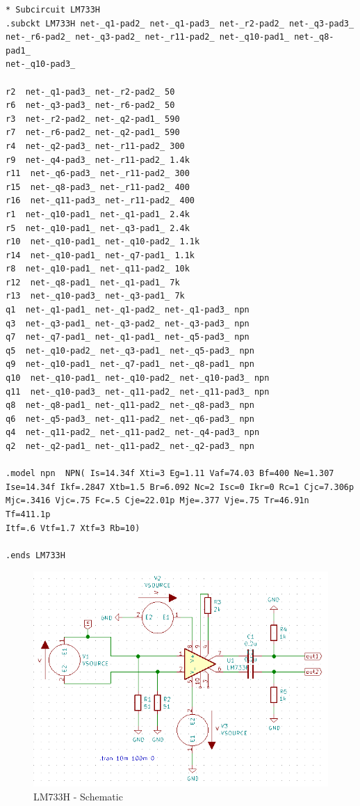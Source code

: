 \documentclass[12pt,a4paper]{report}
\begin{document}
\begin{verbatim}
* Subcircuit LM733H
.subckt LM733H net-_q1-pad2_ net-_q1-pad3_ net-_r2-pad2_ net-_q3-pad3_ 
net-_r6-pad2_ net-_q3-pad2_ net-_r11-pad2_ net-_q10-pad1_ net-_q8-pad1_ 
net-_q10-pad3_ 

r2  net-_q1-pad3_ net-_r2-pad2_ 50
r6  net-_q3-pad3_ net-_r6-pad2_ 50
r3  net-_r2-pad2_ net-_q2-pad1_ 590
r7  net-_r6-pad2_ net-_q2-pad1_ 590
r4  net-_q2-pad3_ net-_r11-pad2_ 300
r9  net-_q4-pad3_ net-_r11-pad2_ 1.4k
r11  net-_q6-pad3_ net-_r11-pad2_ 300
r15  net-_q8-pad3_ net-_r11-pad2_ 400
r16  net-_q11-pad3_ net-_r11-pad2_ 400
r1  net-_q10-pad1_ net-_q1-pad1_ 2.4k
r5  net-_q10-pad1_ net-_q3-pad1_ 2.4k
r10  net-_q10-pad1_ net-_q10-pad2_ 1.1k
r14  net-_q10-pad1_ net-_q7-pad1_ 1.1k
r8  net-_q10-pad1_ net-_q11-pad2_ 10k
r12  net-_q8-pad1_ net-_q1-pad1_ 7k
r13  net-_q10-pad3_ net-_q3-pad1_ 7k
q1  net-_q1-pad1_ net-_q1-pad2_ net-_q1-pad3_ npn
q3  net-_q3-pad1_ net-_q3-pad2_ net-_q3-pad3_ npn
q7  net-_q7-pad1_ net-_q1-pad1_ net-_q5-pad3_ npn
q5  net-_q10-pad2_ net-_q3-pad1_ net-_q5-pad3_ npn
q9  net-_q10-pad1_ net-_q7-pad1_ net-_q8-pad1_ npn
q10  net-_q10-pad1_ net-_q10-pad2_ net-_q10-pad3_ npn
q11  net-_q10-pad3_ net-_q11-pad2_ net-_q11-pad3_ npn
q8  net-_q8-pad1_ net-_q11-pad2_ net-_q8-pad3_ npn
q6  net-_q5-pad3_ net-_q11-pad2_ net-_q6-pad3_ npn
q4  net-_q11-pad2_ net-_q11-pad2_ net-_q4-pad3_ npn
q2  net-_q2-pad1_ net-_q11-pad2_ net-_q2-pad3_ npn

.model npn  NPN( Is=14.34f Xti=3 Eg=1.11 Vaf=74.03 Bf=400 Ne=1.307 
Ise=14.34f Ikf=.2847 Xtb=1.5 Br=6.092 Nc=2 Isc=0 Ikr=0 Rc=1 Cjc=7.306p
Mjc=.3416 Vjc=.75 Fc=.5 Cje=22.01p Mje=.377 Vje=.75 Tr=46.91n Tf=411.1p
Itf=.6 Vtf=1.7 Xtf=3 Rb=10)

.ends LM733H
\end{verbatim}
\vspace{5mm}
\begin{figure}[h]
	\centering
	\includegraphics[scale=0.3]{lm733h_sch}
	\caption{LM733H - Schematic}
\end{figure}
\end{document}
